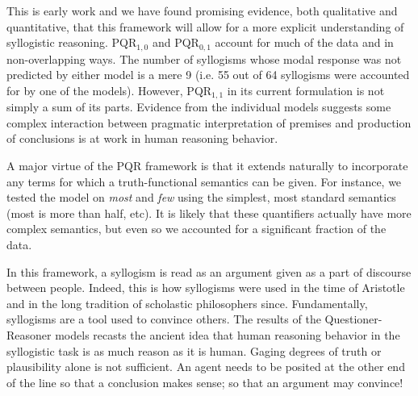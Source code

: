 \documentclass[10pt,letterpaper]{article}
\begin{document}
This is early work and we have found promising evidence, both qualitative and quantitative, that this framework will allow for a more explicit understanding of syllogistic reasoning. 
PQR$_{1,0}$ and PQR$_{0,1}$ account for much of the data and in non-overlapping ways. The number of syllogisms whose modal response was not predicted by either model is a mere 9 (i.e. 55 out of 64 syllogisms were accounted for by one of the models). However, PQR$_{1,1}$ in its current formulation is not simply a sum of its parts. Evidence from the individual models suggests some complex interaction between pragmatic interpretation of premises and production of conclusions is at work in human reasoning behavior. 

A major virtue of the PQR framework is that it extends naturally to incorporate any terms for which a truth-functional semantics can be given.
For instance, we tested the model on \emph{most} and \emph{few} using the simplest, most standard semantics (most is more than half, etc). It is likely that these quantifiers actually have more complex semantics, but even so we accounted for a significant fraction of the data.

In this framework, a syllogism is read as an argument given as a part of discourse between people. Indeed, this is how syllogisms were used in the time of Aristotle and in the long tradition of scholastic philosophers since. Fundamentally, syllogisms are a tool used to convince others. The results of the Questioner-Reasoner models recasts the ancient idea that human reasoning behavior in the syllogistic task is as much reason as it is human. Gaging degrees of truth or plausibility alone is not sufficient. An agent needs to be posited at the other end of the line so that a conclusion makes sense; so that an argument may convince!



\setlength{\bibleftmargin}{.125in}
\setlength{\bibindent}{-\bibleftmargin}


\end{document}
